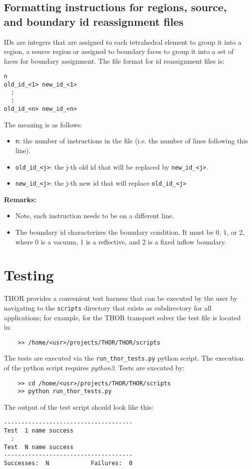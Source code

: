 \subsection{Formatting instructions for regions, source, and boundary id reassignment files}\label{sec:reassign_file_format}
IDs are integers that are assigned to each tetrahedral element to group it into a region, a source region or assigned to boundary
faces to group it into a set of faces for boundary assignment.
The file format for id reassignment files is:
\begin{verbatim}
n
old_id_<1> new_id_<1>
  :
  :
old_id_<n> new_id_<n>
\end{verbatim}
The meaning is as follows:
\begin{itemize}
    \item \verb"n": the number of instructions in the file (i.e. the number of lines following this line).
    \item \verb"old_id_<j>": the j-th old id that will be replaced by \verb"new_id_<j>".
    \item \verb"new_id_<j>": the j-th new id that will replace \verb"old_id_<j>"
\end{itemize}
\textbf{Remarks:}
\begin{itemize}
    \item Note, each instruction needs to be on a different line.
    \item The boundary id characterizes the boundary condition. It must be 0, 1, or 2, where 0 is a vacuum, 1 is a reflective, and 2 is a fixed inflow boundary.
\end{itemize}

\section{Testing}
THOR provides a convenient test harness that can be executed by the user by navigating to the \verb"scripts" directory that exists as subdirectory for all applications; for example, for the THOR transport solver the test file is located in:
\begin{verbatim}
    >> /home/<usr>/projects/THOR/THOR/scripts
\end{verbatim}
The tests are executed via the \verb"run_thor_tests.py" python script. The execution of the python script requires \textit{python3}. Tests are executed by:
\begin{verbatim}
    >> cd /home/<usr>/projects/THOR/THOR/scripts
    >> python run_thor_tests.py
\end{verbatim}
The output of the test script should look like this:
\begin{verbatim}
-------------------------------------
Test  1 name success
  :
Test  N name success
-------------------------------------
Successes:  N            Failures:  0
\end{verbatim}